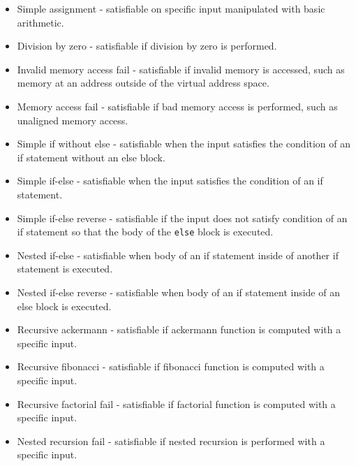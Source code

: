 \documentclass[12pt]{article}
\begin{document}
\begin{itemize}

    \item Simple assignment - satisfiable on specific input manipulated with
        basic arithmetic.

    \item Division by zero - satisfiable if division by zero is performed.

    \item Invalid memory access fail - satisfiable if invalid memory is
        accessed, such as memory at an address outside of the virtual address
        space.
    \item Memory access fail - satisfiable if bad memory access is performed,
        such as unaligned memory access.

    \item Simple if without else - satisfiable when the input satisfies the
        condition of an if statement without an else block.
    \item Simple if-else - satisfiable when the input satisfies the condition
        of an if statement.
    \item Simple if-else reverse - satisfiable if the input does not satisfy
        condition of an if statement so that the body of the \texttt{else}
        block is executed.

    \item Nested if-else - satisfiable when body of an if statement inside of
        another if statement is executed.
    \item Nested if-else reverse - satisfiable when body of an if statement
        inside of an else block is executed.

    \item Recursive ackermann - satisfiable if ackermann function is computed
        with a specific input.
    \item Recursive fibonacci - satisfiable if fibonacci function is computed
        with a specific input.
    \item Recursive factorial fail - satisfiable if factorial function is
        computed with a specific input.
    \item Nested recursion fail - satisfiable if nested recursion is performed
        with a specific input.


\end{itemize}
\end{document}
